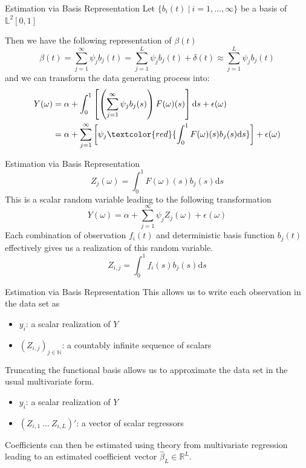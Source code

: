 \documentclass{beamer}
\begin{document}
	\begin{frame}{Estimation via Basis Representation}
		Let $\{b_i(t) \: \vert \: i = 1, \dots, \infty\}$ be a basis of $\mathbb{L}^2[0,1]$
		\vspace{0.2cm}
		
		Then we have the following representation of $\beta(t)$
		$$\beta(t) = \sum_{j = 1}^{\infty} \psi_j b_j(t) = \sum_{j = 1}^{L} \psi_j b_j(t) + \delta(t) \approx \sum_{j = 1}^{L} \psi_j b_j(t)$$
		and we can transform the data generating process into:
		\begin{equation}\notag
			\begin{split}
				Y(\omega) & = \alpha + \int_{0}^{1}\left[\left(\sum_{j = 1}^{\infty} \psi_j  b_j(s)\right) F(\omega)(s) \right]\mathrm{d}s + \epsilon(\omega) \\
						  & = \alpha + \sum_{j = 1}^{\infty} \left[\psi_j \textcolor{red}{\int_{0}^{1} F(\omega)(s) b_j(s)\mathrm{d}s}\right] + \epsilon(\omega)	  
			\end{split}
		\end{equation}
	\end{frame}

	\begin{frame}{Estimation via Basis Representation}
		$$Z_j(\omega) = \int_{0}^{1} F(\omega)(s) b_j(s)\mathrm{d}s$$ 
		This is a scalar random variable leading to the following transformation
		$$Y(\omega) = \alpha + \sum_{j = 1}^{\infty} \psi_j Z_j(\omega) + \epsilon(\omega)$$
		Each combination of observation $f_i(t)$ and deterministic basis function $b_j(t)$ effectively gives us a realization of this random variable.
		$$Z_{i,j} = \int_{0}^{1} f_i(s) b_j(s)\mathrm{d}s$$
		
	\end{frame}

	\begin{frame}{Estimation via Basis Representation}
		This allows us to write each observation in the data set as
		\begin{itemize}
			\item $y_i$: a scalar realization of $Y$
			\item $\left(Z_{i,j}\right)_{j \in \mathbb{N}}$: a countably infinite sequence of scalars
		\end{itemize}
		\vspace{0.2cm}
		
		Truncating the functional basis allows us to approximate the data set in the usual multivariate form.
		\begin{itemize}
			\item $y_i$: a scalar realization of $Y$
			\item $\left(Z_{i,1} \: \dots \:  Z_{i,L} \right)'$: a vector of scalar regressors
		\end{itemize}
		\vspace{0.2cm}
		
		Coefficients can then be estimated using theory from multivariate regression leading to an estimated coefficient vector $\hat{\beta}_L \in \mathbb{R}^L$.
	\end{frame}
\end{document}
